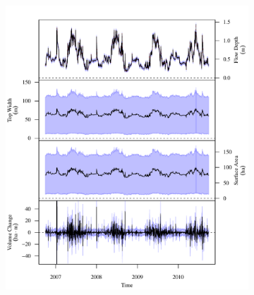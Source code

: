 \subfiguretop
\begin{landscape}
	\begin{figure}
		\begin{subfigure}{0.7\textwidth}
			\centering
			\includegraphics[width=\tableCustomSize]{"Figures/Results_USR/Stochastic/G TS A"}
		\end{subfigure}%
		\begin{subfigure}{0.7\textwidth}
			\centering

\end{subfigure}
\end{figure}
\end{landscape}
